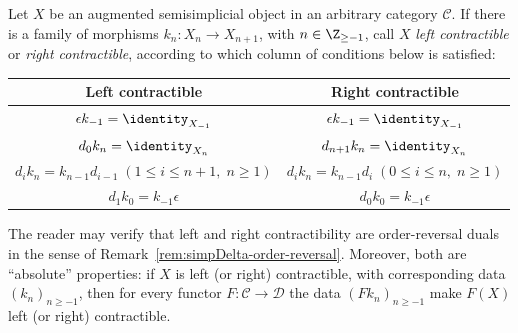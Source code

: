 \begin{definition}\label{def:contractible-aug}
	Let $X$ be an augmented semisimplicial object in an arbitrary category
	$\mathcal{C}$. If there is a family of morphisms
	$k_n:X_n\to X_{n+1}$, with $n\in\Z_{\geq-1}$, call $X$
	\emph{left contractible} or \emph{right contractible}, according to which
	column of conditions below is satisfied:
	\begin{center}
	\begin{tabular}{|c|c|}\hline
		Left contractible&Right contractible\\\hline
		$\epsilon k_{-1}=\identity_{X_{-1}}$
		&$\epsilon k_{-1}=\identity_{X_{-1}}$\\
		$d_0k_n=\identity_{X_n}$
		&$d_{n+1}k_n=\identity_{X_n}$\\
		$d_ik_n=k_{n-1}d_{i-1}\;(1\leq i\leq n+1,\;n\geq1)$
		&$d_ik_n=k_{n-1}d_i\;(0\leq i\leq n,\;n\geq1)$\\
		$d_1k_0=k_{-1}\epsilon$
		&$d_0k_0=k_{-1}\epsilon$\\\hline
	\end{tabular}
	\end{center}
\end{definition}

The reader may verify that left and right contractibility are order-reversal
duals in the sense of Remark~\ref{rem:simpDelta-order-reversal}. Moreover,
both are ``absolute'' properties: if $X$ is left (or right) contractible,
with corresponding data $(k_n)_{n\geq-1}$, then for every functor
$F:\mathcal{C}\to\mathcal{D}$ the data $(Fk_n)_{n\geq-1}$ make $F(X)$
left (or right) contractible.

